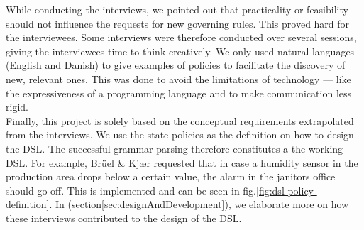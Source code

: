 While conducting the interviews, we pointed out that practicality or feasibility should not influence the requests for new governing rules. This proved hard for the interviewees. Some interviews were therefore conducted over several sessions, giving the interviewees time to think creatively. We only used natural languages (English and Danish) to give examples of policies to facilitate the discovery of new, relevant ones. This was done to avoid the limitations of technology --- like the expressiveness of a programming language and to make communication less rigid.\\ 

Finally, this project is solely based on the conceptual requirements extrapolated from the interviews. We use the state policies as the definition on how to design the DSL. The successful grammar parsing therefore constitutes a the working DSL. For example, Br\"{u}el \& Kj\ae r requested that in case a humidity sensor in the production area drops below a certain value, the alarm in the janitors office should go off. This is implemented and can be seen in fig.\ref{fig:dsl-policy-definition}. In  (section\ref{sec:designAndDevelopment}), we elaborate more on how these interviews contributed to the design of the DSL.
